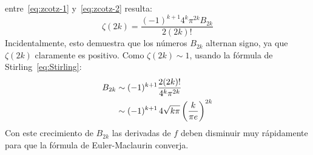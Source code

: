   entre~\eqref{eq:zcotz-1} y~\eqref{eq:zcotz-2} resulta:
  \begin{equation*}
    \zeta(2 k)
      = \frac{(-1)^{k + 1} 4^k \pi^{2 k} B_{2 k}}{2 (2 k)!}
  \end{equation*}
  Incidentalmente,
  esto demuestra que los números \(B_{2 k}\) alternan signo,
  ya que \(\zeta(2 k)\) claramente es positivo.
  Como \(\zeta(2 k) \sim 1\),
  usando la fórmula de Stirling~\eqref{eq:Stirling}:%
  \begin{align}
    B_{2 k}
      &\sim (-1)^{k + 1} \frac{2 (2 k)!}{4^k \pi^{2 k}} \notag \\
      &\sim (-1)^{k + 1} \, 4 \sqrt{k \pi}
	      \left( \frac{k}{\pi e} \right)^{2 k}
		    \label{eq:Bernoulli-approximation}
  \end{align}
  Con este crecimiento de \(B_{2 k}\)
  las derivadas de \(f\) deben disminuir muy rápidamente
  para que la fórmula de Euler-Maclaurin converja.%

